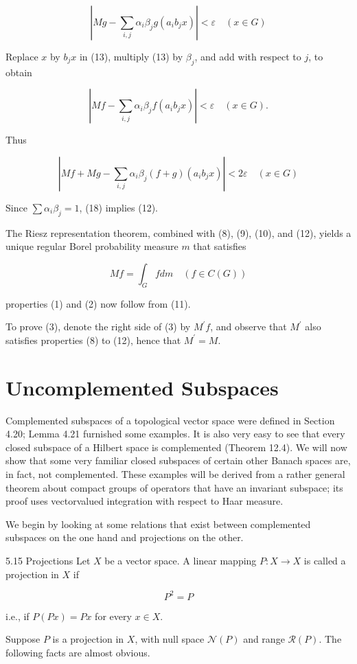 \documentclass[10pt]{article}
\begin{document}
$$
\left|M g-\sum_{i, j} \alpha_{i} \beta_{j} g\left(a_{i} b_{j} x\right)\right|<\varepsilon \quad(x \in G)
$$

Replace $x$ by $b_{j} x$ in (13), multiply (13) by $\beta_{j}$, and add with respect to $j$, to obtain

$$
\left|M f-\sum_{i, j} \alpha_{i} \beta_{j} f\left(a_{i} b_{j} x\right)\right|<\varepsilon \quad(x \in G) .
$$

Thus

$$
\left|M f+M g-\sum_{i, j} \alpha_{i} \beta_{j}(f+g)\left(a_{i} b_{j} x\right)\right|<2 \varepsilon \quad(x \in G)
$$

Since $\sum \alpha_{i} \beta_{j}=1$, (18) implies (12).

The Riesz representation theorem, combined with (8), (9), (10), and (12), yields a unique regular Borel probability measure $m$ that satisfies

$$
M f=\int_{G} f d m \quad(f \in C(G))
$$

properties (1) and (2) now follow from (11).

To prove (3), denote the right side of (3) by $M^{\prime} f$, and observe that $M^{\prime}$ also satisfies properties (8) to (12), hence that $M^{\prime}=M$.

\section{Uncomplemented Subspaces}
Complemented subspaces of a topological vector space were defined in Section 4.20; Lemma 4.21 furnished some examples. It is also very easy to see that every closed subspace of a Hilbert space is complemented (Theorem 12.4). We will now show that some very familiar closed subspaces of certain other Banach spaces are, in fact, not complemented. These examples will be derived from a rather general theorem about
compact groups of operators that have an invariant subspace; its proof uses vectorvalued integration with respect to Haar measure.

We begin by looking at some relations that exist between complemented subspaces on the one hand and projections on the other.

5.15 Projections Let $X$ be a vector space. A linear mapping $P: X \rightarrow X$ is called a projection in $X$ if

$$
P^{2}=P
$$

i.e., if $P(P x)=P x$ for every $x \in X$.

Suppose $P$ is a projection in $X$, with null space $\mathcal{N}(P)$ and range $\mathscr{R}(P)$. The following facts are almost obvious.
\end{document}
